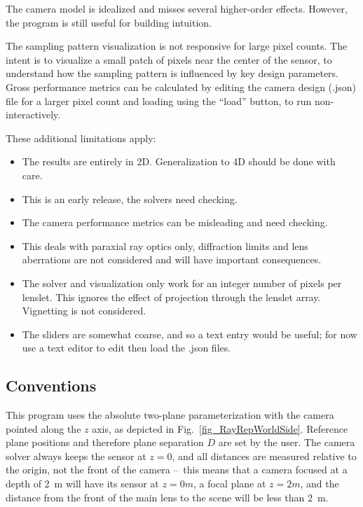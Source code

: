 \documentclass[onecolumn]{article}
\begin{document}
The camera model is idealized and misses several higher-order effects.  However, the program is still useful for building intuition.

The sampling pattern visualization is not responsive for large pixel counts.  The intent is to visualize a small patch of pixels near the center of the sensor, to understand how the sampling pattern is influenced by key design parameters.  Gross performance metrics can be calculated by editing the camera design (.json) file for a larger pixel count and loading using the ``load'' button, to run non-interactively.

These additional limitations apply:
\begin{itemize}
\item The results are entirely in 2D.  Generalization to 4D should be done with care.
\item This is an early release, the solvers need checking.
\item The camera performance metrics can be misleading and need checking.
\item This deals with paraxial ray optics only, diffraction limits and lens aberrations are not considered and will have important consequences.
\item The solver and visualization only work for an integer number of pixels per lenslet.  This ignores the effect of projection through the lenslet array.  Vignetting is not considered.
\item The sliders are somewhat coarse, and so a text entry would be useful; for now use a text editor to edit then load the .json files.
\end{itemize}

\subsection{Conventions}

This program uses the absolute two-plane parameterization with the camera pointed along the $z$ axis, as depicted in Fig.~\ref{fig_RayRepWorldSide}.  Reference plane positions and therefore plane separation $D$ are set by the user.  The camera solver always keeps the sensor at $z=0$, and all distances are measured relative to the origin, not the front of the camera --~this means that a camera focused at a depth of 2~m will have its sensor at $z=0 m$, a focal plane at $z=2 m$, and the distance from the front of the main lens to the scene will be less than 2~m.
\end{document}
